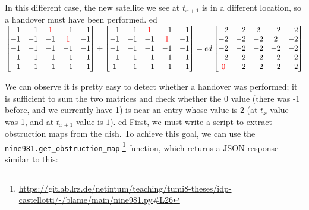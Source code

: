 \documentclass[IN,11pt,twoside,openright,idp,english]{tumthesis}
\begin{document}
In this different case, the new satellite we see at $ t_{x+1} $ is in a different location, so a handover must have been performed. \vspace{10mm}
ed
$\begin{bmatrix}
-1 & -1 & \color{red}1 &           -1 & -1 \\
-1 & -1 &           -1 & \color{red}1 & -1 \\
-1 & -1 &           -1 &           -1 & -1 \\
-1 & -1 &           -1 &           -1 & -1 \\
-1 & -1 &           -1 &           -1 & -1 \\
\end{bmatrix}
+
\begin{bmatrix}
-1 & -1 & \color{red}1 &           -1 & -1 \\
-1 & -1 &           -1 & \color{red}1 & -1 \\
-1 & -1 &           -1 &           -1 & -1 \\
-1 & -1 &           -1 &           -1 & -1 \\
1 & -1 &            -1 &           -1 & -1 \\
\end{bmatrix}
=ed
\begin{bmatrix}
          -2 & -2 & 2 & -2 & -2 \\
          -2 & -2 & -2 & 2 & -2 \\
          -2 & -2 & -2 & -2 & -2 \\
          -2 & -2 & -2 & -2 & -2 \\
\color{red}0 & -2 & -2 & -2 & -2 \\
\end{bmatrix}$

\vspace{10mm}

We can observe it is pretty easy to detect whether a handover was performed; it is sufficient to sum the two matrices and check whether the $ 0 $ value (there was -1 before, and we currently have 1) is near an entry whose value is $ 2 $ (at $ t_{x} $ value was 1, and at $ t_{x+1} $ value is $ 1 $). 
ed
First, we must  write a script to extract obstruction maps from the dish. To achieve this goal, we can use the \texttt{nine981.get\_obstruction\_map} \footnote{\url{https://gitlab.lrz.de/netintum/teaching/tumi8-theses/idp-castellotti/-/blame/main/nine981.py\#L26}} function, which returns a JSON response similar to this:
\end{document}
